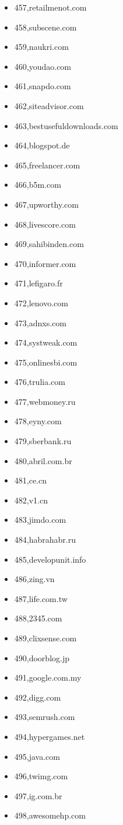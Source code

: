 \begin{multicols}{3}
\begin{itemize}
	\item 457,retailmenot.com
	\item 458,subscene.com
	\item 459,naukri.com
	\item 460,youdao.com
	\item 461,snapdo.com
	\item 462,siteadvisor.com
	\item 463,bestusefuldownloads.com
	\item 464,blogspot.de
	\item 465,freelancer.com
	\item 466,b5m.com
	\item 467,upworthy.com
	\item 468,livescore.com
	\item 469,sahibinden.com
	\item 470,informer.com
	\item 471,lefigaro.fr
	\item 472,lenovo.com
	\item 473,adnxs.com
	\item 474,systweak.com
	\item 475,onlinesbi.com
	\item 476,trulia.com
	\item 477,webmoney.ru
	\item 478,eyny.com
	\item 479,sberbank.ru
	\item 480,abril.com.br
	\item 481,ce.cn
	\item 482,v1.cn
	\item 483,jimdo.com
	\item 484,habrahabr.ru
	\item 485,developunit.info
	\item 486,zing.vn
	\item 487,life.com.tw
	\item 488,2345.com
	\item 489,clixsense.com
	\item 490,doorblog.jp
	\item 491,google.com.my
	\item 492,digg.com
	\item 493,semrush.com
	\item 494,hypergames.net
	\item 495,java.com
	\item 496,twimg.com
	\item 497,ig.com.br
	\item 498,awesomehp.com

\end{itemize}
\end{multicols}
